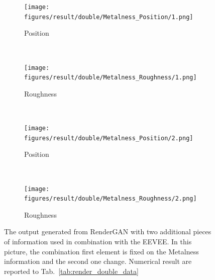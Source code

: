 \begin{figure}[h!]
    \centering
    \begin{subfigure}[b]{0.175\textwidth}
     \texttt{[image: figures/result/double/Metalness\_Position/1.png]}
     \caption{Position}\label{subfig:1}
    \end{subfigure}
    ~
    \begin{subfigure}[b]{0.175\textwidth}
     \texttt{[image: figures/result/double/Metalness\_Roughness/1.png]}
     \caption{Roughness}
    \end{subfigure}
    ~ 
    \begin{subfigure}[b]{0.175\textwidth}
     \texttt{[image: figures/result/double/Metalness\_Position/2.png]}
     \caption{Position}\label{subfig:1}
    \end{subfigure}
    ~
    \begin{subfigure}[b]{0.175\textwidth}
     \texttt{[image: figures/result/double/Metalness\_Roughness/2.png]}
     \caption{Roughness}
    \end{subfigure}
    \caption[Generation Result with fixed input on Metalness]{The output generated from RenderGAN with two additional pieces of information used in combination with the EEVEE. In this picture, the combination first element is fixed on the Metalness information and the second one change. Numerical result are reported to Tab.~\ref{tab:render_double_data}}
    \label{fig:double_input_base_metalness_generation}
\end{figure}

